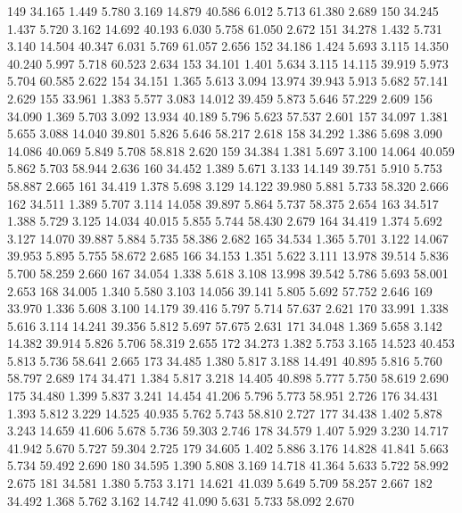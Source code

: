 \documentclass[a4paper,11pt]{scrartcl}
\begin{document}
\begin{Schunk}
\begin{Soutput}
149 34.165  1.449  5.780  3.169 14.879   40.586  6.012  5.713   61.380  2.689
150 34.245  1.437  5.720  3.162 14.692   40.193  6.030  5.758   61.050  2.672
151 34.278  1.432  5.731  3.140 14.504   40.347  6.031  5.769   61.057  2.656
152 34.186  1.424  5.693  3.115 14.350   40.240  5.997  5.718   60.523  2.634
153 34.101  1.401  5.634  3.115 14.115   39.919  5.973  5.704   60.585  2.622
154 34.151  1.365  5.613  3.094 13.974   39.943  5.913  5.682   57.141  2.629
155 33.961  1.383  5.577  3.083 14.012   39.459  5.873  5.646   57.229  2.609
156 34.090  1.369  5.703  3.092 13.934   40.189  5.796  5.623   57.537  2.601
157 34.097  1.381  5.655  3.088 14.040   39.801  5.826  5.646   58.217  2.618
158 34.292  1.386  5.698  3.090 14.086   40.069  5.849  5.708   58.818  2.620
159 34.384  1.381  5.697  3.100 14.064   40.059  5.862  5.703   58.944  2.636
160 34.452  1.389  5.671  3.133 14.149   39.751  5.910  5.753   58.887  2.665
161 34.419  1.378  5.698  3.129 14.122   39.980  5.881  5.733   58.320  2.666
162 34.511  1.389  5.707  3.114 14.058   39.897  5.864  5.737   58.375  2.654
163 34.517  1.388  5.729  3.125 14.034   40.015  5.855  5.744   58.430  2.679
164 34.419  1.374  5.692  3.127 14.070   39.887  5.884  5.735   58.386  2.682
165 34.534  1.365  5.701  3.122 14.067   39.953  5.895  5.755   58.672  2.685
166 34.153  1.351  5.622  3.111 13.978   39.514  5.836  5.700   58.259  2.660
167 34.054  1.338  5.618  3.108 13.998   39.542  5.786  5.693   58.001  2.653
168 34.005  1.340  5.580  3.103 14.056   39.141  5.805  5.692   57.752  2.646
169 33.970  1.336  5.608  3.100 14.179   39.416  5.797  5.714   57.637  2.621
170 33.991  1.338  5.616  3.114 14.241   39.356  5.812  5.697   57.675  2.631
171 34.048  1.369  5.658  3.142 14.382   39.914  5.826  5.706   58.319  2.655
172 34.273  1.382  5.753  3.165 14.523   40.453  5.813  5.736   58.641  2.665
173 34.485  1.380  5.817  3.188 14.491   40.895  5.816  5.760   58.797  2.689
174 34.471  1.384  5.817  3.218 14.405   40.898  5.777  5.750   58.619  2.690
175 34.480  1.399  5.837  3.241 14.454   41.206  5.796  5.773   58.951  2.726
176 34.431  1.393  5.812  3.229 14.525   40.935  5.762  5.743   58.810  2.727
177 34.438  1.402  5.878  3.243 14.659   41.606  5.678  5.736   59.303  2.746
178 34.579  1.407  5.929  3.230 14.717   41.942  5.670  5.727   59.304  2.725
179 34.605  1.402  5.886  3.176 14.828   41.841  5.663  5.734   59.492  2.690
180 34.595  1.390  5.808  3.169 14.718   41.364  5.633  5.722   58.992  2.675
181 34.581  1.380  5.753  3.171 14.621   41.039  5.649  5.709   58.257  2.667
182 34.492  1.368  5.762  3.162 14.742   41.090  5.631  5.733   58.092  2.670

\end{Soutput}
\end{Schunk}
\end{document}
